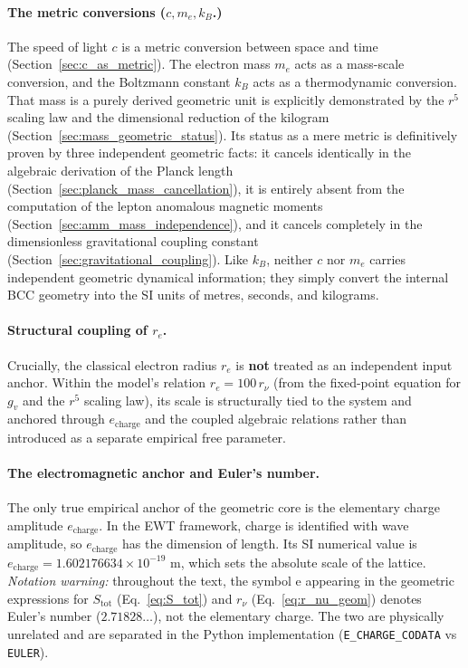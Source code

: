 \documentclass[10pt,a4paper]{article}
\begin{document}
\paragraph{The metric conversions (\(c, m_e, k_B\).)}
The speed of light \(c\) is a metric conversion between space and time (Section~\ref{sec:c_as_metric}). The electron mass \(m_e\) acts as a mass-scale conversion, and the Boltzmann constant \(k_B\) acts as a thermodynamic conversion. That mass is a purely derived geometric unit is explicitly demonstrated by the \(r^5\) scaling law and the dimensional reduction of the kilogram (Section~\ref{sec:mass_geometric_status}). Its status as a mere metric is definitively proven by three independent geometric facts: it cancels identically in the algebraic derivation of the Planck length (Section~\ref{sec:planck_mass_cancellation}), it is entirely absent from the computation of the lepton anomalous magnetic moments (Section~\ref{sec:amm_mass_independence}), and it cancels completely in the dimensionless gravitational coupling constant (Section~\ref{sec:gravitational_coupling}). Like \(k_B\), neither \(c\) nor \(m_e\) carries independent geometric dynamical information; they simply convert the internal BCC geometry into the SI units of metres, seconds, and kilograms.

\paragraph{Structural coupling of \(r_e\).}
Crucially, the classical electron radius \(r_e\) is \textbf{not} treated as an independent input anchor. Within the model's relation \(r_e = 100\,r_\nu\) (from the fixed-point equation for \(g_v\) and the \(r^5\) scaling law), its scale is structurally tied to the system and anchored through \(e_{\text{charge}}\) and the coupled algebraic relations rather than introduced as a separate empirical free parameter.

\paragraph{The electromagnetic anchor and Euler's number.}
The only true empirical anchor of the geometric core is the elementary charge amplitude \(e_{\text{charge}}\). In the EWT framework, charge is identified with wave amplitude, so \(e_{\text{charge}}\) has the dimension of length. Its SI numerical value is \(e_{\text{charge}} = 1.602176634 \times 10^{-19}\text{ m}\), which sets the absolute scale of the lattice.
\textit{Notation warning:} throughout the text, the symbol \(\mathrm{e}\) appearing in the geometric expressions for \(S_{\text{tot}}\) (Eq.~\eqref{eq:S_tot}) and \(r_\nu\) (Eq.~\eqref{eq:r_nu_geom}) denotes Euler's number (\(2.71828\ldots\)), not the elementary charge. The two are physically unrelated and are separated in the Python implementation (\texttt{E\_CHARGE\_CODATA} vs \texttt{EULER}).
\end{document}
